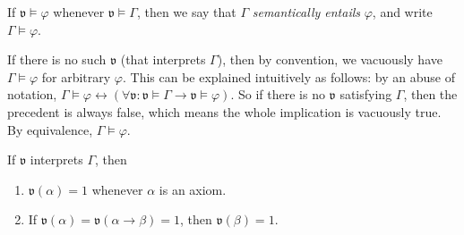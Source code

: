 \documentclass{treatise}
\begin{document}
If $\mathfrak{v} \vDash \varphi$ whenever $\mathfrak{v} \vDash \Gamma$, then we say that $\Gamma$ \emph{semantically entails} $\varphi$, and write $\Gamma \vDash \varphi$.
\begin{remark}
If there is no such $\mathfrak{v}$ (that interprets $\Gamma$), then by convention, we vacuously have $\Gamma \vDash \varphi$ for arbitrary $\varphi$. This can be explained intuitively as follows: by an abuse of notation, $\Gamma \vDash \varphi \leftrightarrow \left( \forall \mathfrak{v}: \mathfrak{v} \vDash \Gamma \rightarrow \mathfrak{v} \vDash \varphi \right)$. So if there is no $\mathfrak{v}$ satisfying $\Gamma$, then the precedent is always false, which means the whole implication is vacuously true. By equivalence, $\Gamma \vDash \varphi$.
\end{remark}
\begin{lemma} \label{logic-propositional-semantics-compatibility}
If $\mathfrak{v}$ interprets $\Gamma$, then
\begin{enumerate}
    \item $\mathfrak{v}(\alpha) = 1$ whenever $\alpha$ is an axiom.
    \item If $\mathfrak{v}(\alpha) = \mathfrak{v}(\alpha \to \beta) = 1$, then $\mathfrak{v}(\beta) = 1$.
\end{enumerate}
\end{lemma}
\end{document}
